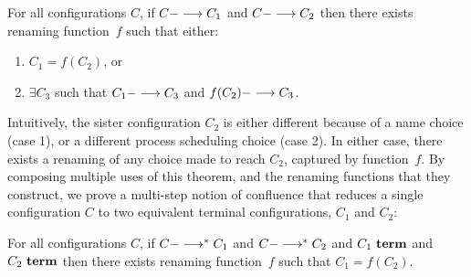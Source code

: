 \begin{theorem}
For all configurations $C$,
%
 if $C ---> C_1$ 
and $C ---> C_2$ 
then 
there exists renaming function~$f$ 
such that either:
\begin{enumerate}
\item %
$C_1 = f(C_2)$,
or
\item $\exists C_3$ such that $C_1 ---> C_3$ and $f(C_2) ---> C_3$.
\end{enumerate}
\end{theorem}

Intuitively, the sister configuration $C_2$ is either different
because of a name choice (case 1), or a different process scheduling choice
(case 2).  In either case, there exists a renaming of any choice made
to reach $C_2$, captured by function~$f$.
%
By composing multiple uses of this theorem, and the renaming functions
that they construct, we prove a multi-step notion of confluence that 
reduces a single configuration $C$ to two equivalent terminal configurations,
 $C_1$ and $C_2$:

\begin{theorem}
For all configurations $C$,
%
 if $C --->^\ast C_1$ 
and $C --->^\ast C_2$ 
and $C_1~\textbf{term}$
and $C_2~\textbf{term}$
then 
there exists renaming function~$f$ 
such that $C_1 = f(C_2)$.
\end{theorem}
